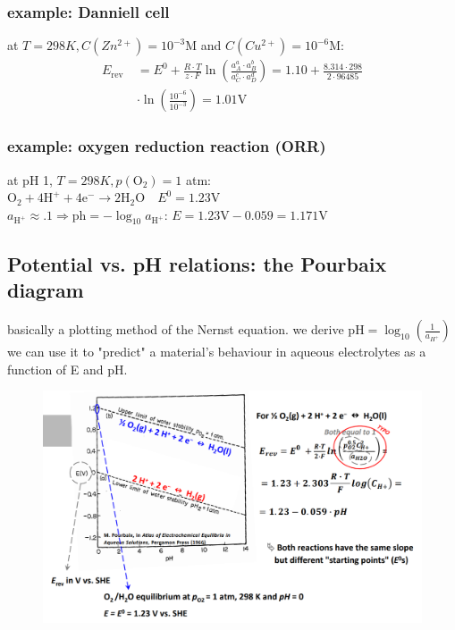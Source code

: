 \documentclass[a4paper,10pt,landscape]{scrartcl}
\begin{document}
\begin{multicols*}{3}
\subsubsection{example: Danniell cell}
at $T = 298 K,
C(Zn^{2+}) = 10^{-3} \mathrm{M}$ and $ C(Cu^{2+}) = 10^{-6} \mathrm{M}$:
\vspace{-.3cm}
\begin{align*}
    E_{\text {rev }} & =E^0+\frac{R \cdot T}{z \cdot F} \ln \left(\frac{a_A^a \cdot a_B^b}{a_C^c \cdot a_D^d}\right)=1.10+\frac{8.314 \cdot 298}{2 \cdot 96485} \\
    & \cdot\ln \left(\frac{10^{-6}}{10^{-3}}\right) = 1.01 \mathrm{V}
\end{align*}
\vspace{-.5cm}

\subsubsection{example: oxygen reduction reaction (ORR)}
at pH 1, $T = 298 K, p(\mathrm{O_2})=1$ atm: \\
$\mathrm{O_2+4H^+ + 4e^- \rightarrow 2H_2O} \quad E^0=1.23 \mathrm{V}$ \\
$a_{\mathrm{H^+}}\approx.1\Rightarrow\mathrm{ph}=-\log_{10}{a_{\mathrm{H^+}}}$: $E=1.23\mathrm{V} - 0.059=1.171 \mathrm{V}$

\subsection{Potential vs. pH relations: the Pourbaix diagram}
basically a plotting method of the Nernst equation. we derive $\mathrm{pH}=\log_{10}\left(\frac{1}{a_{H^+}}\right)$ \\
we can use it to "predict" a material’s
behaviour in aqueous electrolytes
as a function of E and pH.
\vspace{-.5cm}
\begin{figure}[H]
    \centering
    \includegraphics[width=1\linewidth]{src/purbaix_full.png}
\end{figure}
\vspace{-1cm}


\end{multicols*}
\end{document}
